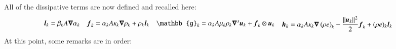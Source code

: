 \documentclass[preprint,10pt]{elsarticle}
\begin{document}
All of the dissipative terms are now defined and recalled here:
%
\begin{subequations}\label{eq:visc-reg-7-equ-sect4}
\begin{align}
  \mbold l_k &= \beta_k A \grad \alpha_k 
\end{align}
\begin{align}
  \mbold f_k &= \alpha_k A \kappa_k \grad \rho_k + \rho_k  \mbold l_k 
\end{align}
\begin{align}
\mathbb{g}_k &= \alpha_k A \mu_k \rho_k \grad^s \mbold u_k + \mbold f_k \otimes \mbold u_k 
\end{align}
\begin{align}
  \mbold h_k &=  \alpha_k A \kappa_k \grad \left( \rho e \right)_k  - \frac{\| \mbold u_k \|^2}{2} \mbold f_k + (\rho e)_k \mbold l_k 
\end{align}
\end{subequations}
%
At this point, some remarks are in order:
\end{document}
